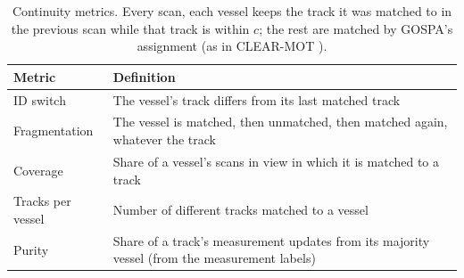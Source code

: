 \begin{table}[htbp]
\centering
\caption{Continuity metrics. Every scan, each vessel keeps the track it was matched to in the previous scan while that track is within $c$; the rest are matched by GOSPA's assignment (as in CLEAR-MOT ).}
\label{tab:exp-continuity}
\small
\begin{tabularx}{\textwidth}{l X}
\toprule
Metric & Definition \\
\midrule
ID switch & The vessel's track differs from its last matched track \\
Fragmentation & The vessel is matched, then unmatched, then matched again, whatever the track \\
Coverage & Share of a vessel's scans in view in which it is matched to a track \\
Tracks per vessel & Number of different tracks matched to a vessel \\
Purity & Share of a track's measurement updates from its majority vessel (from the measurement labels) \\
\bottomrule
\end{tabularx}
\end{table}


